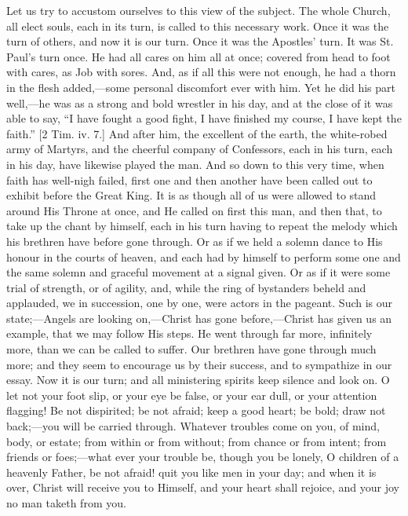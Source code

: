 Let us try to accustom ourselves to this view of the subject. The
whole Church, all elect souls, each in its turn, is called to this
necessary work. Once it was the turn of others, and now it is our
turn. Once it was the Apostles' turn. It was St. Paul's turn once. He
had all cares on him all at once; covered from head to foot with
cares, as Job with sores. And, as if all this were not enough, he had
a thorn in the flesh added,—some personal discomfort ever with him.
Yet he did his part well,—he was as a strong and bold wrestler in
his day, and at the close of it was able to say, ``I have fought a
good fight, I have finished my course, I have kept the faith.'' [2
Tim. iv. 7.] And after him, the excellent of the earth, the
white-robed army of Martyrs, and the cheerful company of Confessors,
each in his turn, each in his day, have likewise played the man. And
so down to this very time, when faith has well-nigh failed, first one
and then another have been called out to exhibit before the Great
King. It is as though all of us were allowed to stand around His
Throne at once, and He called on first this man, and then that, to
take up the chant by himself, each in his turn having to repeat the
melody which his brethren have before gone through. Or as if we held a
solemn dance to His honour in the courts of heaven, and each had by
himself to perform some one and the same solemn and graceful movement
at a signal given. Or as if it were some trial of strength, or of
agility, and, while the ring of bystanders beheld and applauded, we in
succession, one by one, were actors in the pageant. Such is our state;—Angels
are looking on,—Christ has gone before,—Christ has given us an
example, that we may follow His steps. He went through far more,
infinitely more, than we can be called to suffer. Our brethren have
gone through much more; and they seem to encourage us by their
success, and to sympathize in our essay. Now it is our turn; and all
ministering spirits keep silence and look on. O let not your foot
slip, or your eye be false, or your ear dull, or your attention
flagging! Be not dispirited; be not afraid; keep a good heart; be
bold; draw not back;—you will be carried through. Whatever troubles
come on you, of mind, body, or estate; from within or from without;
from chance or from intent; from friends or foes;—what ever your
trouble be, though you be lonely, O children of a heavenly Father, be
not afraid! quit you like men in your day; and when it is over, Christ
will receive you to Himself, and your heart shall rejoice, and your
joy no man taketh from you.

